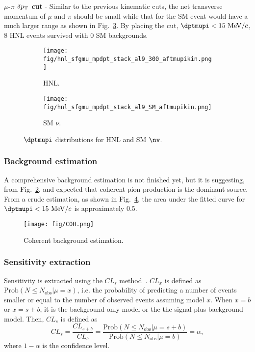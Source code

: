         \textbf{$\mu$-$\pi$ $\delta p_\textrm{T}$ cut} - Similar to the previous kinematic cuts, the net transverse momentum of $\mu$ and $\pi$ should be small while that for the SM event would have a much larger range as shown in Fig.~\ref{fig:mmupi-dpt}. By placing the cut, $\dptmupi<15~\mevc$, $8$ HNL events survived with $0$ SM backgrounds.
        
        \begin{figure}[!htb]
           \centering
           \begin{subfigure}{0.45\textwidth}
                \texttt{[image: fig/hnl\_sfgmu\_mpdpt\_stack\_al9\_300\_aftmupikin.png]}
                \caption{HNL.}
                \label{fig:hnl-mupidpt}
           \end{subfigure}
           \begin{subfigure}{0.45\textwidth}
                \texttt{[image: fig/hnl\_sfgmu\_mpdpt\_stack\_al9\_SM\_aftmupikin.png]}
                \caption{SM $\nu$.}
                \label{fig:sm-mupidpt}
           \end{subfigure}
           \caption{$\dptmupi$ distributions for HNL and SM $\nv$.}
           \label{fig:mmupi-dpt}
        \end{figure}

    
    \subsubsection{Background estimation}
        A comprehensive background estimation is not finished yet, but it is suggesting, from Fig.~\ref{fig:sm-mupidpt}, and expected that coherent pion production is the dominant source. 
        From a crude estimation, as shown in Fig.~\ref{fig:coh-bkg}, the area under the fitted curve for $\dptmupi<15~\mevc$ is approximately $0.5$. 
        \begin{figure}[!htb] 
            \centering
            \texttt{[image: fig/COH.png]}
            \caption{Coherent background estimation.}
            \label{fig:coh-bkg}
        \end{figure}    
        
    \subsubsection{Sensitivity extraction}
        Sensitivity is extracted using the $CL_s$ method~\cite{Read_2002}.
        $CL_x$ is defined as $\textrm{Prob}(N\leq N_{\textrm{obs}}| \mu = x)$, i.e. the probability of predicting a number of events smaller or equal to the number of observed events assuming model $x$. When $x=b$ or $x=s+b$, it is the background-only model or the the signal plus background model.
        Then, $CL_s$ is defined as 
        \begin{equation}
            CL_s = \frac{CL_{s+b}}{CL_{b}} = \frac{\textrm{Prob}(N\leq N_{\textrm{obs}}| \mu = s+b)}{\textrm{Prob}(N\leq N_{\textrm{obs}}| \mu = b)} = \alpha,
        \end{equation}
        where $1-\alpha$ is the confidence level.

